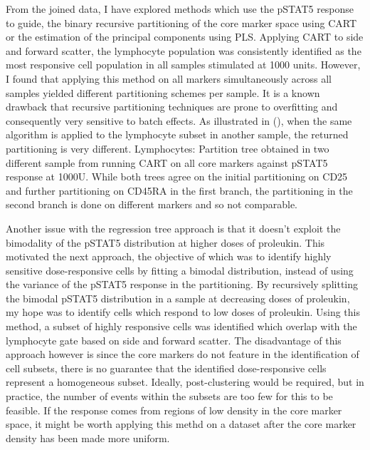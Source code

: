 From the joined data, I have explored methods which use the pSTAT5 response to guide, the binary recursive partitioning of the core marker space using \gls{CART} or the estimation of the principal components using \gls{PLS}.
Applying \gls{CART} to side and forward scatter, the lymphocyte population was consistently identified as the most responsive cell population in all samples stimulated at 1000 units.
However, I found that applying this method on all markers simultaneously across all samples yielded different partitioning schemes per sample.
It is a known drawback that recursive partitioning techniques are prone to overfitting and consequently very sensitive to batch effects.
As illustrated in (), when the same algorithm is applied to the lymphocyte subset in another sample, the returned partitioning is very different.
{ Lymphocytes: Partition tree obtained in two different sample from running CART on all core markers against pSTAT5 response at 1000U. }
{
  While both trees agree on the initial partitioning on CD25 and further partitioning on CD45RA in the first branch,
  the partitioning in the second branch is done on different markers and so not comparable.
} 


Another issue with the regression tree approach is that it doesn't exploit the bimodality of the pSTAT5 distribution at higher doses of proleukin.
This motivated the next approach, the objective of which was to identify highly sensitive dose-responsive cells by fitting a bimodal distribution, instead of using the variance of the pSTAT5 response in the partitioning.
By recursively splitting the bimodal pSTAT5 distribution in a sample at decreasing doses of proleukin, my hope was to identify cells which respond to low doses of proleukin.
Using this method, a subset of highly responsive cells was identified which overlap with the lymphocyte gate based on side and forward scatter.
The disadvantage of this approach however is since the core markers do not feature in the identification of cell subsets, there is no guarantee that the identified dose-responsive cells represent a homogeneous subset.
Ideally, post-clustering would be required, but in practice, the number of events within the subsets are too few for this to be feasible.
If the response comes from regions of low density in the core marker space, it might be worth applying this methd on a dataset after the core marker density has been made more uniform.

